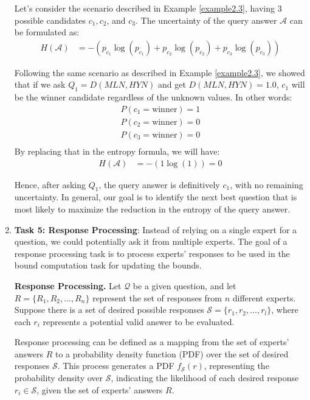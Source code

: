 \begin{enumerate}
    \begin{example}
        Let's consider the scenario described in Example \ref{example2.3}, having 3 possible candidates $c_1, c_2$, and $c_3$. The uncertainty of the query answer $\mathcal{A}$ can be formulated as:
        \begin{align*}
    H(\mathcal{A}) &= - (p_{c_1} \log(p_{c_1}) + p_{c_2} \log(p_{c_2}) + p_{c_3} \log(p_{c_3}))
    \end{align*}

    Following the same scenario as described in Example \ref{example2.3}, we showed that if we ask $Q_1 = D(MLN, HYN)$ and get \(D(MLN, HYN) = 1.0 \), $c_1$ will be the winner candidate regardless of the unknown values. In other words:
    \begin{align*}
   P(c_1 = \text{winner}) = 1 \\
   P(c_2 = \text{winner}) = 0 \\
   P(c_3 = \text{winner}) = 0 \\
    \end{align*}
    By replacing that in the entropy formula, we will have:
    \begin{align*}
    H(\mathcal{A}) &= - (1 \log(1)) = 0
    \end{align*}

    Hence, after asking \(Q_1\), the query answer is definitively \(c_1\), with no remaining uncertainty. In general, our goal is to identify the next best question that is most likely to maximize the reduction in the entropy of the query answer.
        
    \end{example}
    

   \item \textbf{Task 5: Response Processing}: Instead of relying on a single expert for a question, we could potentially ask it from multiple experts. The goal of a response processing task is to process experts' responses to be used in the bound computation task for updating the bounds.   

\begin{definition}
    \textbf{Response Processing. }Let $\mathcal{Q}$ be a given question, and let $R = \{R_1, R_2, \ldots, R_n\}$ represent the set of responses from $n$ different experts. Suppose there is a set of desired possible responses $\mathcal{S} = \{r_1, r_2, \ldots, r_l\}$, where each $r_i$ represents a potential valid answer to be evaluated.

Response processing can be defined as a mapping from the set of experts' answers $R$ to a probability density function (PDF) over the set of desired responses $\mathcal{S}$. This process generates a PDF $f_{\mathcal{S}}(r)$, representing the probability density over $\mathcal{S}$, indicating the likelihood of each desired response $r_i \in \mathcal{S}$, given the set of experts' answers $R$. 


\end{definition}
\end{enumerate}
